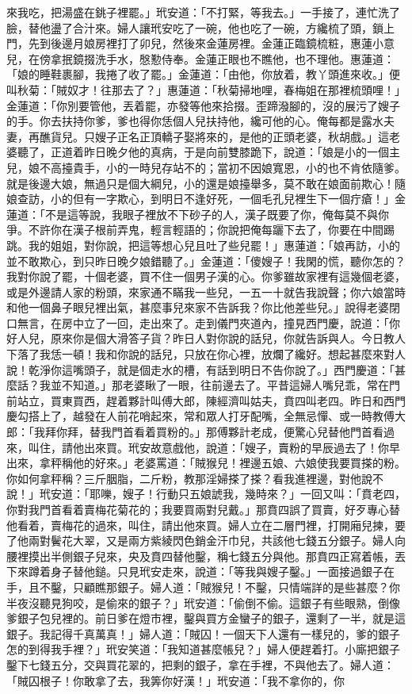 來我吃，把湯盛在銚子裡罷。」玳安道：「不打緊，等我去。」一手接了，連忙洗了臉，替他盪了合汁來。婦人讓玳安吃了一碗，他也吃了一碗，方纔梳了頭，鎖上門，先到後邊月娘房裡打了卯兒，然後來金蓮房裡。金蓮正臨鏡梳粧，惠蓮小意兒，在傍拿抿鏡掇洗手水，慇懃侍奉。金蓮正眼也不瞧他，也不理他。惠蓮道：「娘的睡鞋裹腳，我捲了收了罷。」金蓮道：「由他，你放着，教丫頭進來收。」便叫秋菊：「賊奴才！往那去了？」惠蓮道：「秋菊掃地哩，春梅姐在那裡梳頭哩！」金蓮道：「你別要管他，丟着罷，亦發等他來拾掇。歪蹄潑腳的，沒的展污了嫂子的手。你去扶持你爹，爹也得你恁個人兒扶持他，纔可他的心。俺每都是露水夫妻，再醮貨兒。只嫂子正名正頂轎子娶將來的，是他的正頭老婆，秋胡戲。」這老婆聽了，正道着昨日晚夕他的真病，于是向前雙膝跪下，說道：「娘是小的一個主兒，娘不高擡貴手，小的一時兒存站不的；當初不因娘寬恩，小的也不肯依隨爹。就是後邊大娘，無過只是個大綱兒，小的還是娘擡舉多，莫不敢在娘面前欺心！隨娘查訪，小的但有一字欺心，到明日不逢好死，一個毛孔兒裡生下一個疔瘡！」金蓮道：「不是這等說，我眼子裡放不下砂子的人，漢子既要了你，俺每莫不與你爭。不許你在漢子根前弄鬼，輕言輕語的；你說把俺每躧下去了，你要在中間踢跳。我的姐姐，對你說，把這等想心兒且吐了些兒罷！」惠蓮道：「娘再訪，小的並不敢欺心，到只昨日晚夕娘錯聽了。」金蓮道：「傻嫂子！我閑的慌，聽你怎的？我對你說了罷，十個老婆，買不住一個男子漢的心。你爹雖故家裡有這幾個老婆，或是外邊請人家的粉頭，來家通不瞞我一些兒，一五一十就告我說聲；你六娘當時和他一個鼻子眼兒裡出氣，甚麼事兒來家不告訴我？你比他差些兒。」說得老婆閉口無言，在房中立了一回，走出來了。走到儀門夾道內，撞見西門慶，說道：「你好人兒，原來你是個大滑答子貨？昨日人對你說的話兒，你就告訴與人。今日教人下落了我恁一頓！我和你說的話兒，只放在你心裡，放爛了纔好。想起甚麼來對人說！乾淨你這嘴頭子，就是個走水的槽，有話到明日不告你說了。」西門慶道：「甚麼話？我並不知道。」那老婆瞅了一眼，往前邊去了。平昔這婦人嘴兒乖，常在門前站立，買東買西，趕着夥計叫傅大郎，陳經濟叫姑夫，賁四叫老四。昨日和西門慶勾搭上了，越發在人前花哨起來，常和眾人打牙配嘴，全無忌憚、或一時教傅大郎：「我拜你拜，替我門首看着買粉的。」那傅夥計老成，便驚心兒替他門首看過來，叫住，請他出來買。玳安故意戲他，說道：「嫂子，賣粉的早辰過去了！你早出來，拿秤稱他的好來。」老婆罵道：「賊猴兒！裡邊五娘、六娘使我要買搽的粉。你如何拿秤稱？三斤胭脂，二斤粉，教那淫婦搽了搽？看我進裡邊，對他說不說！」玳安道：「耶嚛，嫂子！行動只五娘諕我，幾時來？」一回又叫：「賁老四，你對我門首看着賣梅花菊花的；我要買兩對兒戴。」那賁四誤了買賣，好歹專心替他看着，賣梅花的過來，叫住，請出他來買。婦人立在二層門裡，打開廂兒揀，要了他兩對鬢花大翠，又是兩方紫綾閃色銷金汗巾兒，共該他七錢五分銀子。婦人向腰裡摸出半側銀子兒來，央及賁四替他鑿，稱七錢五分與他。那賁四正寫着帳，丟下來蹲着身子替他鎚。只見玳安走來，說道：「等我與嫂子鑿。」一面接過銀子在手，且不鑿，只顧瞧那銀子。婦人道：「賊猴兒！不鑿，只情端詳的是些甚麼？你半夜沒聽見狗咬，是偷來的銀子？」玳安道：「偷倒不偷。這銀子有些眼熟，倒像爹銀子包兒裡的。前日爹在燈市裡，鑿與買方金蠻子的銀子，還剩了一半，就是這銀子。我記得千真萬真！」婦人道：「賊囚！一個天下人還有一樣兒的，爹的銀子怎的到得我手裡？」玳安笑道：「我知道甚麼帳兒？」婦人便趕着打。小廝把銀子鑿下七錢五分，交與買花翠的，把剩的銀子，拿在手裡，不與他去了。婦人道：「賊囚根子！你敢拿了去，我筭你好漢！」玳安道：「我不拿你的，你